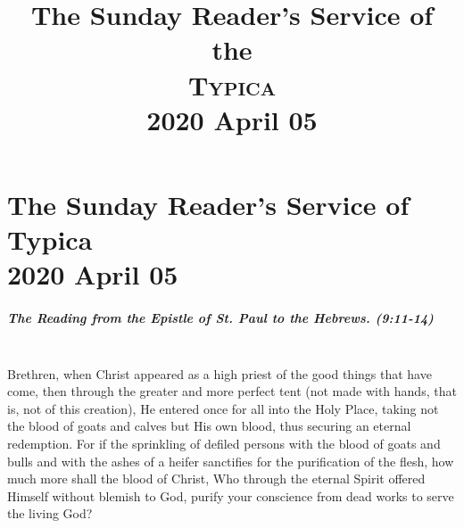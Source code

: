 \documentclass[twoside, letterpaper, 12pt]{report}
\title{The Sunday Reader's Service of the \\ \textsc{Typica} \\ 2020 April 05}
\date{}
\author{}
\begin{document}
\maketitle
\pagestyle{empty} %
\cleardoublepage
\pagestyle{plain}
\setcounter{page}{1} %
\chapter*{The Sunday Reader's Service of Typica\\ 2020 April 05}

\trisagionNeedsAmen[reader]







\paragraph{The Reading from the Epistle of St. Paul to the Hebrews. (9:11-14)}\mbox{}\\

Brethren, when Christ appeared as a high priest of the good things that have come,
then through the greater and more perfect tent
(not made with hands, that is, not of this creation),
He entered once for all into the Holy Place,
taking not the blood of goats and calves but His own blood,
thus securing an eternal redemption.
For if the sprinkling of defiled persons with the blood of goats and bulls and with the ashes of a
heifer sanctifies for the purification of the flesh, how much more shall the blood of Christ,
Who through the eternal Spirit offered Himself without blemish to God,
purify your conscience from dead works to serve the living God?
\end{document}
